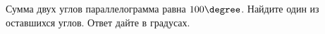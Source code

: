 \begin{ex}
	\begin{condition}
		Сумма двух углов параллелограмма равна \( 100\degree \). Найдите один из оставшихся углов. Ответ дайте в градусах.
	\end{condition}
\end{ex}